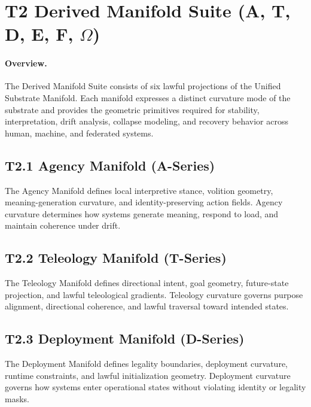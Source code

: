 
\section{T2 Derived Manifold Suite (A, T, D, E, F, $\Omega$)}

\paragraph{Overview.}
The Derived Manifold Suite consists of six lawful projections of the Unified
Substrate Manifold. Each manifold expresses a distinct curvature mode of the
substrate and provides the geometric primitives required for stability,
interpretation, drift analysis, collapse modeling, and recovery behavior across
human, machine, and federated systems.

\subsection{T2.1 Agency Manifold (A-Series)}
The Agency Manifold defines local interpretive stance, volition geometry,
meaning-generation curvature, and identity-preserving action fields. Agency
curvature determines how systems generate meaning, respond to load, and
maintain coherence under drift.

\subsection{T2.2 Teleology Manifold (T-Series)}
The Teleology Manifold defines directional intent, goal geometry, future-state
projection, and lawful teleological gradients. Teleology curvature governs
purpose alignment, directional coherence, and lawful traversal toward intended
states.

\subsection{T2.3 Deployment Manifold (D-Series)}
The Deployment Manifold defines legality boundaries, deployment curvature,
runtime constraints, and lawful initialization geometry. Deployment curvature
governs how systems enter operational states without violating identity or
legality masks.


